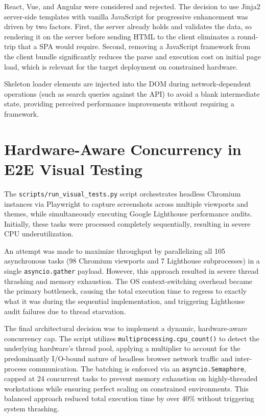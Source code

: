 \documentclass[11pt,a4paper]{book}
\begin{document}
React, Vue, and Angular were considered and rejected. The decision to use Jinja2 server-side templates with vanilla JavaScript for progressive enhancement was driven by two factors. First, the server already holds and validates the data, so rendering it on the server before sending HTML to the client eliminates a round-trip that a SPA would require. Second, removing a JavaScript framework from the client bundle significantly reduces the parse and execution cost on initial page load, which is relevant for the target deployment on constrained hardware.

Skeleton loader elements are injected into the DOM during network-dependent operations (such as search queries against the API) to avoid a blank intermediate state, providing perceived performance improvements without requiring a framework.

\section{Hardware-Aware Concurrency in E2E Visual Testing}

The \texttt{scripts/run\_visual\_tests.py} script orchestrates headless Chromium instances via Playwright to capture screenshots across multiple viewports and themes, while simultaneously executing Google Lighthouse performance audits. Initially, these tasks were processed completely sequentially, resulting in severe CPU underutilization.

An attempt was made to maximize throughput by parallelizing all 105 asynchronous tasks (98 Chromium viewports and 7 Lighthouse subprocesses) in a single \texttt{asyncio.gather} payload. However, this approach resulted in severe thread thrashing and memory exhaustion. The OS context-switching overhead became the primary bottleneck, causing the total execution time to regress to exactly what it was during the sequential implementation, and triggering Lighthouse audit failures due to thread starvation.

The final architectural decision was to implement a dynamic, hardware-aware concurrency cap. The script utilizes \texttt{multiprocessing.cpu\_count()} to detect the underlying hardware's thread pool, applying a multiplier to account for the predominantly I/O-bound nature of headless browser network traffic and inter-process communication. The batching is enforced via an \texttt{asyncio.Semaphore}, capped at 24 concurrent tasks to prevent memory exhaustion on highly-threaded workstations while ensuring perfect scaling on constrained environments. This balanced approach reduced total execution time by over 40\% without triggering system thrashing.
\end{document}
